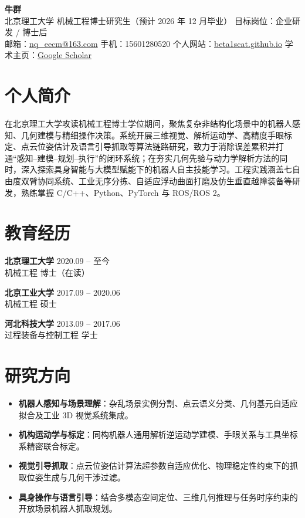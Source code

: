 \documentclass[10.5pt,a4paper]{article}
\newcommand{\entry}[4]{%
  \noindent\textbf{#1} \hfill #2\\
  {\color{subtextgray}#3} \hfill {#4}\par\vspace{1.5pt}
}
\newcommand{\textlink}[2]{\href{#1}{\color{textmain}#2}}
\begin{document}
\color{textmain}

{\LARGE\bfseries\color{titlecolor} 牛群}\\[3pt]
北京理工大学 \quad 机械工程博士研究生（预计 2026 年 12 月毕业） \quad 目标岗位：企业研发 / 博士后\\
邮箱：\textlink{mailto:nq_eecm@163.com}{nq\_eecm@163.com} \quad 手机：15601280520 \quad 个人网站：\textlink{https://beta1scat.github.io/}{beta1scat.github.io} \quad 学术主页：\textlink{https://scholar.google.com/citations?hl=en&user=6E4Hd8UAAAAJ}{Google Scholar}

\section*{个人简介}
在北京理工大学攻读机械工程博士学位期间，聚焦复杂非结构化场景中的机器人感知、几何建模与精细操作决策。系统开展三维视觉、解析运动学、高精度手眼标定、点云位姿估计及语言引导抓取等算法链路研究，致力于消除误差累积并打通“感知--建模--规划--执行”的闭环系统；在夯实几何先验与动力学解析方法的同时，深入探索具身智能与大模型赋能下的机器人自主技能学习。工程实践涵盖七自由度双臂协同系统、工业无序分拣、自适应浮动曲面打磨及仿生垂直越障装备等研发，熟练掌握 C/C++、Python、PyTorch 与 ROS/ROS 2。

\section*{教育经历}
\entry{北京理工大学}{2020.09 -- 至今}{机械工程}{博士（在读）}
\entry{北京工业大学}{2017.09 -- 2020.06}{机械工程}{硕士}
\entry{河北科技大学}{2013.09 -- 2017.06}{过程装备与控制工程}{学士}

\section*{研究方向}
\begin{itemize}
	\item \textbf{机器人感知与场景理解}：杂乱场景实例分割、点云语义分类、几何基元自适应拟合及工业 3D 视觉系统集成。
	\item \textbf{机构运动学与标定}：同构机器人通用解析逆运动学建模、手眼关系与工具坐标系精密联合标定。
	\item \textbf{视觉引导抓取}：点云位姿估计算法超参数自适应优化、物理稳定性约束下的抓取位姿生成与几何干涉过滤。
	\item \textbf{具身操作与语言引导}：结合多模态空间定位、三维几何推理与任务时序约束的开放场景机器人抓取规划。
\end{itemize}
\end{document}
